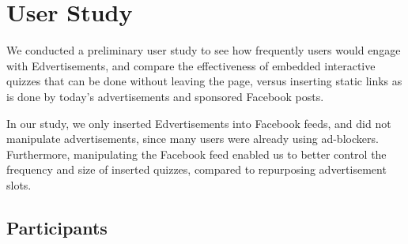 \documentclass{sigchi}
\begin{document}


\section{User Study}

We conducted a preliminary user study to see how frequently users would engage with Edvertisements, and compare the effectiveness of embedded interactive quizzes that can be done without leaving the page, versus inserting static links as is done by today's advertisements and sponsored Facebook posts. %


In our study, we only inserted Edvertisements into Facebook feeds, and did not manipulate advertisements, since many users were already using ad-blockers. Furthermore, manipulating the Facebook feed enabled us to better control the frequency and size of inserted quizzes, compared to repurposing advertisement slots. %


\subsection{Participants}
\end{document}
